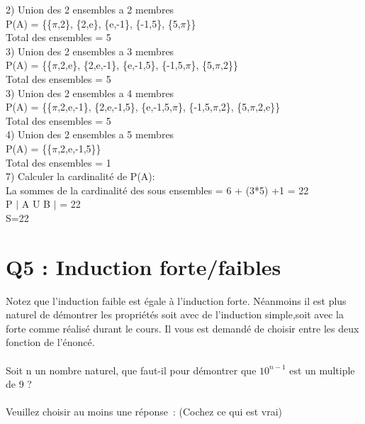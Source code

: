 2) Union des 2 ensembles a 2 membres \\

P(A) = \{\{$\pi$,2\}, \{2,e\}, \{e,-1\}, \{-1,5\}, \{5,$\pi$\}\} \\

Total des ensembles = 5 \\

3) Union des 2 ensembles a 3 membres \\

P(A) = \{\{$\pi$,2,e\}, \{2,e,-1\}, \{e,-1,5\}, \{-1,5,$\pi$\}, \{5,$\pi$,2\}\} \\

Total des ensembles = 5 \\

3) Union des 2 ensembles a 4 membres \\

P(A) = \{\{$\pi$,2,e,-1\}, \{2,e,-1,5\}, \{e,-1,5,$\pi$\}, \{-1,5,$\pi$,2\}, \{5,$\pi$,2,e\}\} \\

Total des ensembles = 5 \\

4) Union des 2 ensembles a 5 membres \\

P(A) = \{\{$\pi$,2,e,-1,5\}\} \\

Total des ensembles = 1 \\

7) Calculer la cardinalité de P(A):\\

La sommes de la cardinalité des sous ensembles = 6 + (3*5) +1 = 22\\

P $|$ A U B $|$ = 22 \\

S=22 \\


\newpage
\section{Q5 : Induction forte/faibles}

\vspace{5mm} %

Notez que l’induction faible est égale à l’induction forte. Néanmoins il est plus naturel de démontrer les propriétés soit avec de l’induction simple,soit avec la forte comme réalisé durant le cours. Il vous est demandé de choisir entre les deux fonction de l’énoncé.\\ \\
Soit n un nombre naturel, que faut-il pour démontrer que $10^{n-1}$ est un multiple de 9 ? \\ \\
Veuillez choisir au moins une réponse : (Cochez ce qui est vrai)\\


